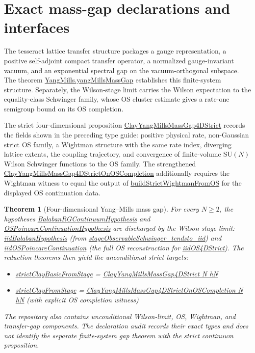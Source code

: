 \documentclass[11pt]{article}
\numberwithin{equation}{section}
\newtheorem{theorem}{Theorem}[section]
\newcommand{\SU}{\mathrm{SU}}
\newcommand{\Lean}[1]{\url{#1}}
\begin{document}
\section{Exact mass-gap declarations and interfaces}\label{sec:interfaces}

The tesseract lattice transfer structure packages a gauge representation, a positive self-adjoint compact transfer operator, a normalized gauge-invariant vacuum, and an exponential spectral gap on the vacuum-orthogonal subspace. The theorem \Lean{YangMills.yangMillsMassGap} establishes this finite-system structure. Separately, the Wilson-stage limit carries the Wilson expectation to the equality-class Schwinger family, whose OS cluster estimate gives a rate-one semigroup bound on its OS completion.

The strict four-dimensional proposition \Lean{ClayYangMillsMassGap4DStrict} records the fields shown in the preceding type guide: positive physical rate, non-Gaussian strict OS family, a Wightman structure with the same rate index, diverging lattice extents, the coupling trajectory, and convergence of finite-volume \(\SU(N)\) Wilson Schwinger functions to the OS family. The strengthened \Lean{ClayYangMillsMassGap4DStrictOnOSCompletion} additionally requires the Wightman witness to equal the output of \Lean{buildStrictWightmanFromOS} for the displayed OS continuation data.

\begin{theorem}[Four-dimensional Yang--Mills mass gap]
For every \(N\geq2\), the hypotheses \Lean{BalabanRGContinuumHypothesis} and \Lean{OSPoincareContinuationHypothesis} are discharged by the Wilson stage limit: \Lean{iidBalabanHypothesis} (from \Lean{stageObservableSchwinger_tendsto_iid}) and \Lean{iidOSPoincareContinuation} (the full OS reconstruction for \Lean{iidOS4DStrict}). The reduction theorems then yield the unconditional strict targets:
\begin{itemize}
\item \Lean{strictClayBasicFromStage} = \Lean{ClayYangMillsMassGap4DStrict N hN}
\item \Lean{strictClayFromStage} = \Lean{ClayYangMillsMassGap4DStrictOnOSCompletion N hN} (with explicit OS completion witness)
\end{itemize}
The repository also contains unconditional Wilson-limit, OS, Wightman, and transfer-gap components. The declaration audit records their exact types and does not identify the separate finite-system gap theorem with the strict continuum proposition.
\end{theorem}
\end{document}

